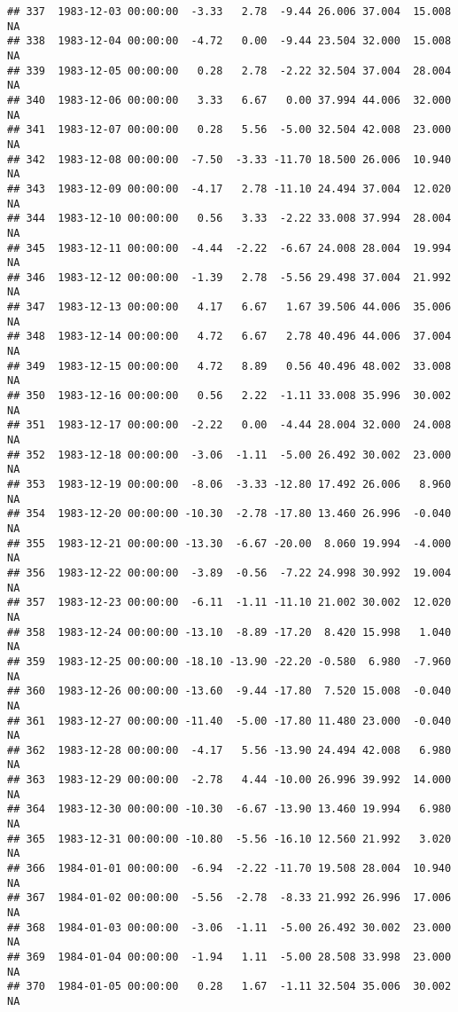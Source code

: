 \documentclass{article}\usepackage{graphicx, color}
\makeatletter
\newenvironment{kframe}{%
 \def\at@end@of@kframe{}%
 \ifinner\ifhmode%
  \def\at@end@of@kframe{\end{minipage}}%
  \begin{minipage}{\columnwidth}%
 \fi\fi%
 \def\FrameCommand##1{\hskip\@totalleftmargin \hskip-\fboxsep
 \colorbox{shadecolor}{##1}\hskip-\fboxsep
     \hskip-\linewidth \hskip-\@totalleftmargin \hskip\columnwidth}%
 \MakeFramed {\advance\hsize-\width
   \@totalleftmargin\z@ \linewidth\hsize
   \@setminipage}}%
 {\par\unskip\endMakeFramed%
 \at@end@of@kframe}
\newenvironment{knitrout}{}{} %
\makeatother
\begin{document}
\begin{knitrout}
\begin{kframe}
\begin{verbatim}
## 337  1983-12-03 00:00:00  -3.33   2.78  -9.44 26.006 37.004  15.008     NA
## 338  1983-12-04 00:00:00  -4.72   0.00  -9.44 23.504 32.000  15.008     NA
## 339  1983-12-05 00:00:00   0.28   2.78  -2.22 32.504 37.004  28.004     NA
## 340  1983-12-06 00:00:00   3.33   6.67   0.00 37.994 44.006  32.000     NA
## 341  1983-12-07 00:00:00   0.28   5.56  -5.00 32.504 42.008  23.000     NA
## 342  1983-12-08 00:00:00  -7.50  -3.33 -11.70 18.500 26.006  10.940     NA
## 343  1983-12-09 00:00:00  -4.17   2.78 -11.10 24.494 37.004  12.020     NA
## 344  1983-12-10 00:00:00   0.56   3.33  -2.22 33.008 37.994  28.004     NA
## 345  1983-12-11 00:00:00  -4.44  -2.22  -6.67 24.008 28.004  19.994     NA
## 346  1983-12-12 00:00:00  -1.39   2.78  -5.56 29.498 37.004  21.992     NA
## 347  1983-12-13 00:00:00   4.17   6.67   1.67 39.506 44.006  35.006     NA
## 348  1983-12-14 00:00:00   4.72   6.67   2.78 40.496 44.006  37.004     NA
## 349  1983-12-15 00:00:00   4.72   8.89   0.56 40.496 48.002  33.008     NA
## 350  1983-12-16 00:00:00   0.56   2.22  -1.11 33.008 35.996  30.002     NA
## 351  1983-12-17 00:00:00  -2.22   0.00  -4.44 28.004 32.000  24.008     NA
## 352  1983-12-18 00:00:00  -3.06  -1.11  -5.00 26.492 30.002  23.000     NA
## 353  1983-12-19 00:00:00  -8.06  -3.33 -12.80 17.492 26.006   8.960     NA
## 354  1983-12-20 00:00:00 -10.30  -2.78 -17.80 13.460 26.996  -0.040     NA
## 355  1983-12-21 00:00:00 -13.30  -6.67 -20.00  8.060 19.994  -4.000     NA
## 356  1983-12-22 00:00:00  -3.89  -0.56  -7.22 24.998 30.992  19.004     NA
## 357  1983-12-23 00:00:00  -6.11  -1.11 -11.10 21.002 30.002  12.020     NA
## 358  1983-12-24 00:00:00 -13.10  -8.89 -17.20  8.420 15.998   1.040     NA
## 359  1983-12-25 00:00:00 -18.10 -13.90 -22.20 -0.580  6.980  -7.960     NA
## 360  1983-12-26 00:00:00 -13.60  -9.44 -17.80  7.520 15.008  -0.040     NA
## 361  1983-12-27 00:00:00 -11.40  -5.00 -17.80 11.480 23.000  -0.040     NA
## 362  1983-12-28 00:00:00  -4.17   5.56 -13.90 24.494 42.008   6.980     NA
## 363  1983-12-29 00:00:00  -2.78   4.44 -10.00 26.996 39.992  14.000     NA
## 364  1983-12-30 00:00:00 -10.30  -6.67 -13.90 13.460 19.994   6.980     NA
## 365  1983-12-31 00:00:00 -10.80  -5.56 -16.10 12.560 21.992   3.020     NA
## 366  1984-01-01 00:00:00  -6.94  -2.22 -11.70 19.508 28.004  10.940     NA
## 367  1984-01-02 00:00:00  -5.56  -2.78  -8.33 21.992 26.996  17.006     NA
## 368  1984-01-03 00:00:00  -3.06  -1.11  -5.00 26.492 30.002  23.000     NA
## 369  1984-01-04 00:00:00  -1.94   1.11  -5.00 28.508 33.998  23.000     NA
## 370  1984-01-05 00:00:00   0.28   1.67  -1.11 32.504 35.006  30.002     NA

\end{verbatim}
\end{kframe}
\end{knitrout}
\end{document}
